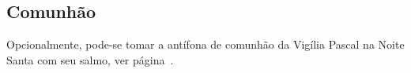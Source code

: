\AllowPageFlush

\subsection{Comunhão}\label{subsection:tempus-paschale/dominica-resurrectionis/communio}

\begin{rubrica}
  Opcionalmente, pode-se tomar a antífona de comunhão da Vigília Pascal na Noite Santa com seu salmo, ver página~\pageref{subsection:hebdomada-sancta/ad-vigiliam-paschalem-in-nocte-sancta/communio}.
\end{rubrica}
